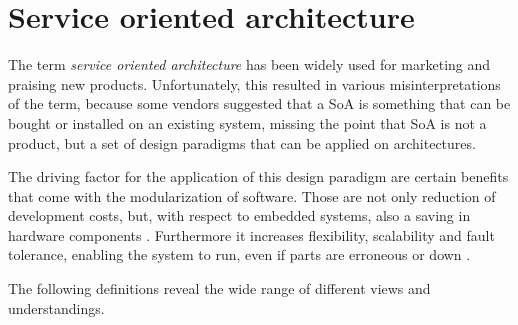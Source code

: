 \section{Service oriented architecture}
\label{ch:soa}

The term \emph{service oriented architecture} has been widely used for marketing and praising new products. Unfortunately, this resulted in various misinterpretations of the term, because some vendors suggested that a SoA is something that can be bought or installed on an existing system, missing the point that SoA is not a product, but a set of design paradigms that can be applied on architectures.

The driving factor for the application of this design paradigm are certain benefits that come with the modularization of software. Those are not only reduction of development costs, but, with respect to embedded systems, also a saving in hardware components \cite{sommer}. Furthermore it increases flexibility, scalability and fault tolerance, enabling the system to run, even if parts are erroneous or down \cite[p.33]{rosen} \cite[p.17-18]{josuttis}.

The following definitions reveal the wide range of different views and understandings.

